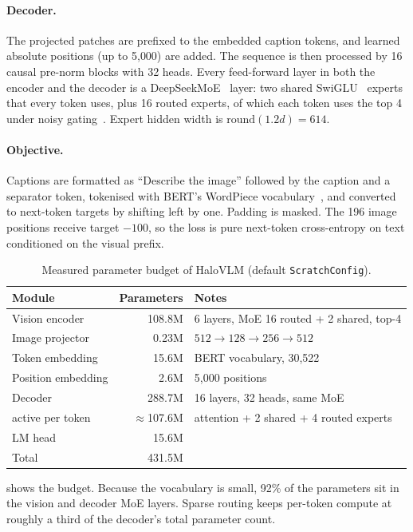 \documentclass[11pt]{article}
\begin{document}
\paragraph{Decoder.} The projected patches are prefixed to the embedded caption tokens, and
learned absolute positions (up to 5{,}000) are added. The sequence is then processed by 16
causal pre-norm blocks with 32 heads. Every feed-forward layer in both the encoder and the
decoder is a DeepSeekMoE~\cite{dai2024deepseekmoe} layer: two shared SwiGLU~\cite{shazeer2020glu}
experts that every token uses, plus 16 routed experts, of which each token uses the top 4
under noisy gating~\cite{shazeer2017outrageously}. Expert hidden width is
$\mathrm{round}(1.2d)=614$.

\paragraph{Objective.} Captions are formatted as ``Describe the image'' followed by the
caption and a separator token, tokenised with BERT's WordPiece
vocabulary~\cite{devlin2019bert}, and converted to next-token targets by shifting left by
one. Padding is masked. The 196 image positions receive target $-100$, so the loss is pure
next-token cross-entropy on text conditioned on the visual prefix.

\begin{table}[t]
\centering
\caption{Measured parameter budget of HaloVLM (default \texttt{ScratchConfig}).}
\label{tab:halo}
\begin{tabular}{lrl}
\toprule
Module & Parameters & Notes \\
\midrule
Vision encoder & 108.8M & 6 layers, MoE 16 routed + 2 shared, top-4 \\
Image projector & 0.23M & $512\to128\to256\to512$ \\
Token embedding & 15.6M & BERT vocabulary, 30{,}522 \\
Position embedding & 2.6M & 5{,}000 positions \\
Decoder & 288.7M & 16 layers, 32 heads, same MoE \\
\quad active per token & $\approx$107.6M & attention + 2 shared + 4 routed experts \\
LM head & 15.6M & \\
\midrule
Total & 431.5M & \\
\bottomrule
\end{tabular}
\end{table}

 shows the budget. Because the vocabulary is small, 92\% of the parameters
sit in the vision and decoder MoE layers. Sparse routing keeps per-token compute at roughly
a third of the decoder's total parameter count.
\end{document}
